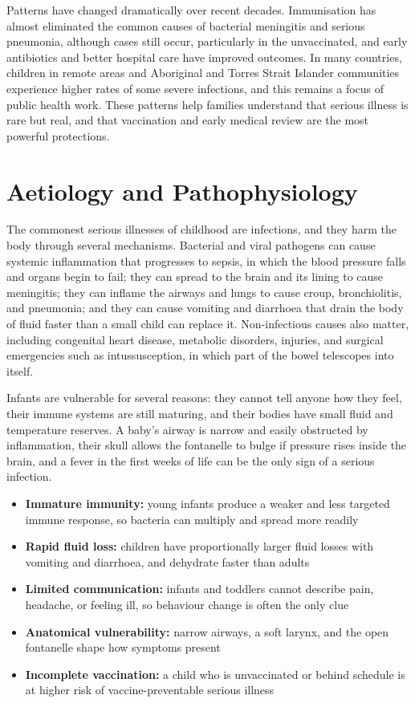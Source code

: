 Patterns have changed dramatically over recent decades. Immunisation has almost eliminated the common causes of bacterial meningitis and serious pneumonia, although cases still occur, particularly in the unvaccinated, and early antibiotics and better hospital care have improved outcomes. In many countries, children in remote areas and Aboriginal and Torres Strait Islander communities experience higher rates of some severe infections, and this remains a focus of public health work. These patterns help families understand that serious illness is rare but real, and that vaccination and early medical review are the most powerful protections.

\section*{Aetiology and Pathophysiology}
The commonest serious illnesses of childhood are infections, and they harm the body through several mechanisms. Bacterial and viral pathogens can cause systemic inflammation that progresses to sepsis, in which the blood pressure falls and organs begin to fail; they can spread to the brain and its lining to cause meningitis; they can inflame the airways and lungs to cause croup, bronchiolitis, and pneumonia; and they can cause vomiting and diarrhoea that drain the body of fluid faster than a small child can replace it. Non-infectious causes also matter, including congenital heart disease, metabolic disorders, injuries, and surgical emergencies such as intussusception, in which part of the bowel telescopes into itself.

Infants are vulnerable for several reasons: they cannot tell anyone how they feel, their immune systems are still maturing, and their bodies have small fluid and temperature reserves. A baby's airway is narrow and easily obstructed by inflammation, their skull allows the fontanelle to bulge if pressure rises inside the brain, and a fever in the first weeks of life can be the only sign of a serious infection.

\begin{itemize}
    \item \textbf{Immature immunity:} young infants produce a weaker and less targeted immune response, so bacteria can multiply and spread more readily
    \item \textbf{Rapid fluid loss:} children have proportionally larger fluid losses with vomiting and diarrhoea, and dehydrate faster than adults
    \item \textbf{Limited communication:} infants and toddlers cannot describe pain, headache, or feeling ill, so behaviour change is often the only clue
    \item \textbf{Anatomical vulnerability:} narrow airways, a soft larynx, and the open fontanelle shape how symptoms present
    \item \textbf{Incomplete vaccination:} a child who is unvaccinated or behind schedule is at higher risk of vaccine-preventable serious illness
\end{itemize}


